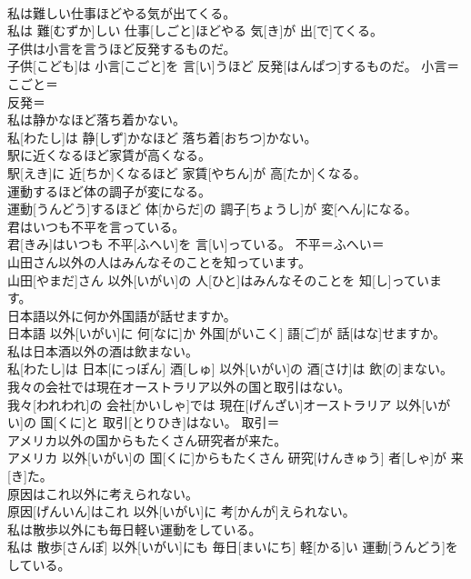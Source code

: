 \documentclass[8pt]{extreport}
\begin{document}
\begin{CJK}{UTF8}{min}
\\	私は難しい仕事ほどやる気が出てくる。	
\\	私は 難[むずか]しい 仕事[しごと]ほどやる 気[き]が 出[で]てくる。	
\\	子供は小言を言うほど反発するものだ。	
\\	子供[こども]は 小言[こごと]を 言[い]うほど 反発[はんぱつ]するものだ。	小言＝こごと＝ 
\\	反発＝ 
\\	私は静かなほど落ち着かない。	
\\	私[わたし]は 静[しず]かなほど 落ち着[おちつ]かない。	
\\	駅に近くなるほど家賃が高くなる。	
\\	駅[えき]に 近[ちか]くなるほど 家賃[やちん]が 高[たか]くなる。	
\\	運動するほど体の調子が変になる。	
\\	運動[うんどう]するほど 体[からだ]の 調子[ちょうし]が 変[へん]になる。	
\\	君はいつも不平を言っている。	
\\	君[きみ]はいつも 不平[ふへい]を 言[い]っている。	不平＝ふへい＝ 
\\	山田さん以外の人はみんなそのことを知っています。	
\\	山田[やまだ]さん 以外[いがい]の 人[ひと]はみんなそのことを 知[し]っています。	
\\	日本語以外に何か外国語が話せますか。	
\\	日本語 以外[いがい]に 何[なに]か 外国[がいこく] 語[ご]が 話[はな]せますか。	
\\	私は日本酒以外の酒は飲まない。	
\\	私[わたし]は 日本[にっぽん] 酒[しゅ] 以外[いがい]の 酒[さけ]は 飲[の]まない。	
\\	我々の会社では現在オーストラリア以外の国と取引はない。	
\\	我々[われわれ]の 会社[かいしゃ]では 現在[げんざい]オーストラリア 以外[いがい]の 国[くに]と 取引[とりひき]はない。	取引＝ 
\\	アメリカ以外の国からもたくさん研究者が来た。	
\\	アメリカ 以外[いがい]の 国[くに]からもたくさん 研究[けんきゅう] 者[しゃ]が 来[き]た。	
\\	原因はこれ以外に考えられない。	
\\	原因[げんいん]はこれ 以外[いがい]に 考[かんが]えられない。	
\\	私は散歩以外にも毎日軽い運動をしている。	
\\	私は 散歩[さんぽ] 以外[いがい]にも 毎日[まいにち] 軽[かる]い 運動[うんどう]をしている。	

\end{CJK}
\end{document}
